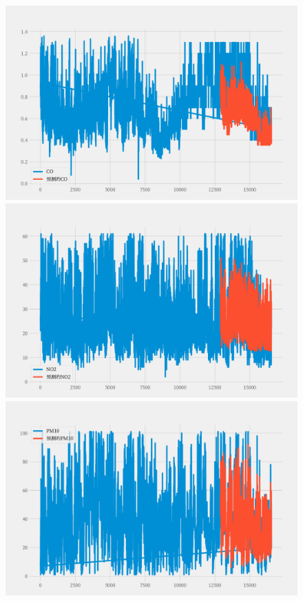 \documentclass[a4paper,10pt]{my_paper}
\numberwithin{equation}{section}
\begin{document}
\begin{figure}[htbp]
	\centering
		\begin{minipage}[c]{0.3\textwidth} %
			\centering
			\includegraphics[width=1\textwidth]{prob3/预测C地_CO.pdf} %
		\end{minipage}%
		\begin{minipage}[c]{0.3\textwidth}
			\centering
			\includegraphics[width=1\textwidth]{prob3/预测C地_NO2.pdf}
		\end{minipage}
		\begin{minipage}[c]{0.3\textwidth}
			\centering
			\includegraphics[width=1\textwidth]{prob3/预测C地_PM10.pdf}

\end{minipage}
\end{figure}
\end{document}
